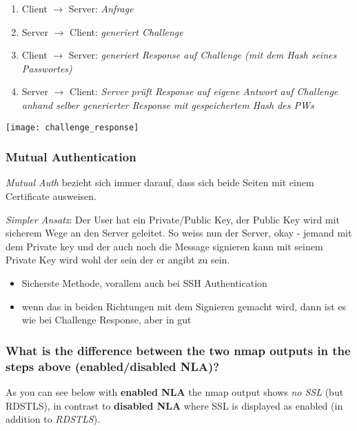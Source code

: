 \begin{minipage}{0.45\linewidth}
    \begin{enumerate}
        \item Client $\rightarrow$ Server: \textit{Anfrage}
        \item Server $\rightarrow$ Client: \textit{generiert Challenge}
        \item Client $\rightarrow$ Server: \textit{generiert Response auf Challenge (mit dem Hash seines Passwortes)}
        \item Server $\rightarrow$ Client: \textit{Server prüft Response auf eigene Antwort auf Challenge anhand selber generierter Response mit gespeichertem Hash des PWs}
    \end{enumerate}
\end{minipage}
\begin{minipage}{0.5\linewidth}
    \begin{center}
        \texttt{[image: challenge\_response]}
        \vspace{-8pt}
    \end{center}
\end{minipage}

\subsubsection{Mutual Authentication}
\textit{Mutual Auth} bezieht sich immer darauf, dass sich beide Seiten mit einem Certificate ausweisen.

\textit{Simpler Ansatz}: Der User hat ein Private/Public Key, der Public Key wird mit sicherem Wege an den Server geleitet. So weiss nun der Server, okay - jemand mit dem Private key und der auch noch die Message signieren kann mit seinem Private Key wird wohl der sein der er angibt zu sein.\\
\begin{itemize}
    \item Sicherste Methode, vorallem auch bei SSH Authentication
    \item wenn das in beiden Richtungen mit dem Signieren gemacht wird, dann ist es wie bei Challenge Response, aber in gut
\end{itemize}

\subsubsection{What is the difference between the two nmap outputs in the steps above (enabled/disabled NLA)?}
As you can see below with \textbf{enabled NLA} the nmap output shows \textit{no SSL} (but RDSTLS), in contrast to \textbf{disabled NLA} where SSL is displayed as enabled (in addition to \textit{RDSTLS}).

